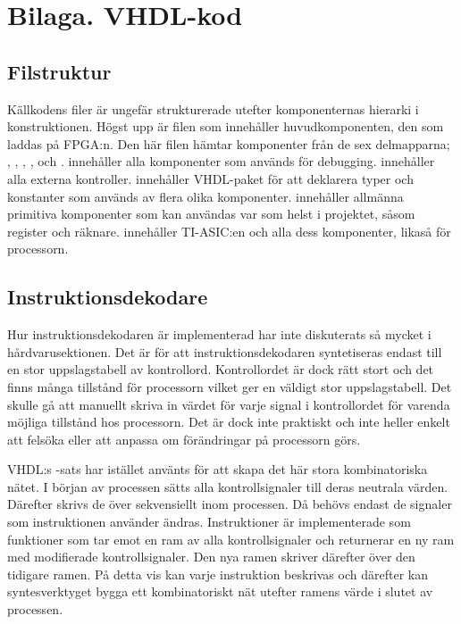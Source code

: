 \documentclass[main.tex]{subfiles}
\begin{document}
\section{Bilaga. VHDL-kod}

\subsection{Filstruktur}
Källkodens filer är ungefär strukturerade utefter komponenternas hierarki i
konstruktionen. Högst upp är filen  som innehåller
huvudkomponenten, den som laddas på FPGA:n. Den här filen hämtar komponenter
från de sex delmapparna; , , , ,
 och .  innehåller alla komponenter som används
för debugging.  innehåller alla externa kontroller. 
innehåller VHDL-paket för att deklarera typer och konstanter som används av
flera olika komponenter.  innehåller allmänna primitiva komponenter
som kan användas var som helst i projektet, såsom register och räknare.
 innehåller TI-ASIC:en och alla dess komponenter,  likaså
för processorn.

\subsection{Instruktionsdekodare}
Hur instruktionsdekodaren är implementerad har inte diskuterats så mycket i
hårdvaru\-sektionen. Det är för att instruktionsdekodaren syntetiseras endast
till en stor uppslagstabell av kontrollord. Kontrollordet är dock rätt stort
och det finns många tillstånd för processorn vilket ger en väldigt stor
uppslagstabell. Det skulle gå att manuellt skriva in värdet för varje signal i
kontrollordet för varenda möjliga tillstånd hos processorn. Det är dock inte
praktiskt och inte heller enkelt att felsöka eller att anpassa om förändringar
på processorn görs.

VHDL:s -sats har istället använts för att skapa det här stora
kombinatoriska nätet. I början av processen sätts alla kontrollsignaler till
deras neutrala värden. Därefter skrivs de över sekvensiellt inom processen. Då
behövs endast de signaler som instruktionen använder ändras. Instruktioner är
implementerade som funktioner som tar emot en ram av alla kontrollsignaler och
returnerar en ny ram med modifierade kontrollsignaler. Den nya ramen skriver
därefter över den tidigare ramen. På detta vis kan varje instruktion beskrivas
och därefter kan syntesverktyget bygga ett kombinatoriskt nät utefter ramens
värde i slutet av processen.
\end{document}
